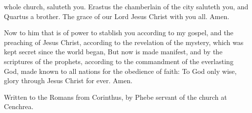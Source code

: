 {whole
church,
saluteth
you.
Erastus the
chamberlain of the
city
saluteth
you,
and
Quartus a
brother.
The
grace
of
our
Lord
Jesus
Christ
{}
with
you
all.
Amen.
\par }{\PP {}Now to him that is of
power to
stablish
you according
to
my
gospel,
and the
preaching of
Jesus
Christ, according
to the
revelation of the
mystery, which was kept
secret since the world
began,
But
now is made
manifest,
and
by the
scriptures of the
prophets, according
to the
commandment of
the
everlasting
God, made
known
to
all
nations
for the
obedience of
faith:
To
God
only
wise,
{}
glory
through
Jesus
Christ
for
ever.
Amen.
\par }{\SH Written to the Romans from Corinthus,
{} by Phebe servant of the church at Cenchrea.
\par }